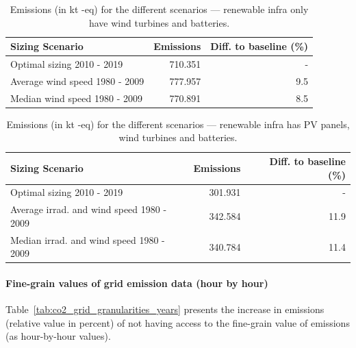     
 \begin{table}[H]   
  \caption{Emissions (in kt -eq) for the different scenarios --- renewable infra only have wind turbines and batteries.} \centering

   \label{tab:co2_10y_wt_only}
  
      \begin{tabular}{|l|r|r|}        
        \hline
        \textbf{Sizing Scenario} &  \textbf{Emissions } & \textbf{Diff. to baseline (\%) } \\
        
        \hline
        Optimal sizing 2010 - 2019       &       710.351 &  -        \\
        \hline     
        Average wind speed 1980 - 2009  &       777.957 &  9.5      \\
        \hline 
        Median wind speed  1980 - 2009  &       770.891 &  8.5      \\
        \hline        
      \end{tabular}      
    \end{table}

       
\begin{table}[H]
  \caption{Emissions (in kt -eq) for the different scenarios --- renewable infra has PV panels, wind turbines and batteries.} \centering
    \label{tab:co2_10y}
      \begin{tabular}{|l|r|r|}        
        \hline        
        \textbf{Sizing Scenario} &  \textbf{Emissions } & \textbf{Diff. to baseline (\%) } \\
        \hline        
        Optimal sizing 2010 - 2019  &       301.931 & - \\
        \hline     
        Average irrad. and wind speed  1980 - 2009  &      342.584 &  11.9 \\
        \hline
        Median irrad. and wind speed  1980 - 2009  &      340.784 &   11.4 \\
        \hline        
      \end{tabular}      
    \end{table}

    
\paragraph{Fine-grain values of grid emission data (hour by hour)}

Table~\ref{tab:co2_grid_granularities_years} presents the increase in  emissions (relative value in percent) of not having access to the fine-grain value of  emissions (as hour-by-hour values).


